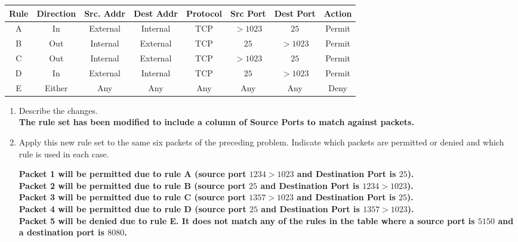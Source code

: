 \documentclass[12pt]{article}
\begin{document}
\begin{enumerate}
  \begin{center}
   \begin{tabular}{||c c c c c c c c||}
   \hline
   Rule & Direction & Src. Addr & Dest Addr  & Protocol & Src Port &  Dest Port & Action \\ [0.5ex]
   \hline\hline
   A & In & External & Internal & TCP & $>1023$ & $25$ & Permit \\
   \hline
   B & Out & Internal & External & TCP & $25$ & $>1023$ & Permit \\
   \hline
   C & Out & Internal & External & TCP & $>1023$ & $25$ & Permit \\
   \hline
   D & In & External & Internal & TCP & $25$ & $>1023$ & Permit \\
   \hline
   E & Either & Any & Any & Any & Any & Any & Deny \\ [1ex]
   \hline
  \end{tabular}
  \end{center}

  \begin{enumerate}
    \item Describe the changes. \\

    \textbf{The rule set has been modified to include a column of Source Ports to match against packets.} \\

    \item Apply this new rule set to the same six packets of the preceding problem. Indicate which packets are permitted or denied and which rule is used in each case.

    \textbf{Packet 1 will be permitted due to rule A (source port $1234 > 1023$ and  Destination Port is $25$).} \\

    \textbf{Packet 2 will be permitted due to rule B (source port $25$ and  Destination Port is $1234 > 1023$).} \\

    \textbf{Packet 3 will be permitted due to rule C (source port $1357 > 1023$ and  Destination Port is $25$).} \\

    \textbf{Packet 4 will be permitted due to rule D (source port $25$ and  Destination Port is $1357 > 1023$).} \\

    \textbf{Packet 5 will be denied due to rule E. It does not match any of the rules in the table where a source port is $5150$ and a destination port is $8080$.} \\


\end{enumerate}
\end{enumerate}
\end{document}
